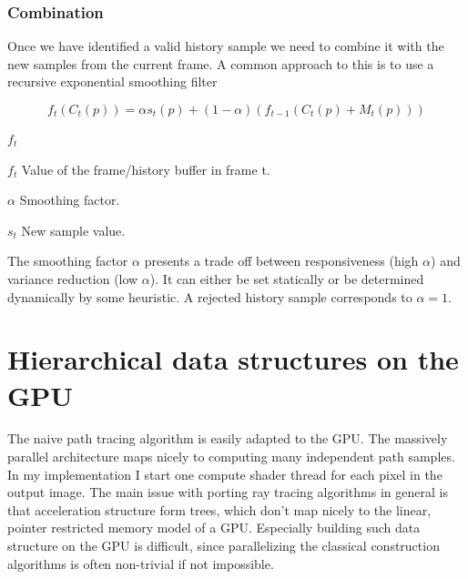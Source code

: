 \documentclass{ACGSeminar}
\begin{document}
\subsubsection{Combination}
Once we have identified a valid history sample we need to combine it with the new samples from the current frame. A common approach to this is to use a recursive exponential smoothing filter \cite{Yang:2009} 

\begin{equation}
f_t(C_{t}(p)) = \alpha s_t(p) + (1-\alpha)(f_{t-1}(C_{t}(p) + M_t(p)))
\end{equation}
\begin{labeling}{$f_t$}
\item [$f_t$] Value of the frame/history buffer in frame t.
\item [$\alpha$] Smoothing factor.
\item [$s_t$] New sample value.
\end{labeling}

The smoothing factor $\alpha$ presents a trade off between responsiveness (high $\alpha$) and variance reduction (low $\alpha$). It can either be set statically or be determined dynamically by some heuristic. A rejected history sample corresponds to $\alpha = 1$. 

\section{Hierarchical data structures on the GPU} \label{gpu-adapting}
The naive path tracing algorithm is easily adapted to the GPU. The massively parallel architecture maps nicely to computing many independent path samples. In my implementation I start one compute shader thread for each pixel in the output image. The main issue with porting ray tracing algorithms in general is that acceleration structure form trees, which don't map nicely to the linear, pointer restricted memory model of a GPU. Especially building such data structure on the GPU is difficult, since parallelizing the classical construction algorithms is often non-trivial if not impossible. \cite[1]{Karras:2012:MPC:2383795.2383801}
\end{document}
